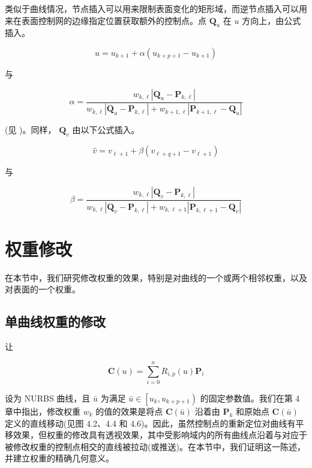 \documentclass[../main.tex]{subfiles}
\begin{document}
类似于曲线情况，节点插入可以用来限制表面变化的矩形域，而逆节点插入可以用来在表面控制网的边缘指定位置获取额外的控制点。点 \({\mathbf{Q}}_{u}\) 在 \(u\) 方向上，由公式插入。

\[
\widehat{u} = {u}_{k + 1} + \alpha \left( {{u}_{k + p + 1} - {u}_{k + 1}}\right)  \tag{11.15}
\]

与

\[
\alpha  = \frac{{w}_{k,\ell }\left| {{\mathbf{Q}}_{u} - {\mathbf{P}}_{k,\ell }}\right| }{{w}_{k,\ell }\left| {{\mathbf{Q}}_{u} - {\mathbf{P}}_{k,\ell }}\right|  + {w}_{k + 1,\ell }\left| {{\mathbf{P}}_{k + 1,\ell } - {\mathbf{Q}}_{u}}\right| }
\]

(见 \cite{Pieg89d})。同样， \({\mathbf{Q}}_{v}\) 由以下公式插入。

\[
\widehat{v} = {v}_{\ell  + 1} + \beta \left( {{v}_{\ell  + q + 1} - {v}_{\ell  + 1}}\right)  \tag{11.16}
\]

与

\[
\beta  = \frac{{w}_{k,\ell }\left| {{\mathbf{Q}}_{v} - {\mathbf{P}}_{k,\ell }}\right| }{{w}_{k,\ell }\left| {{\mathbf{Q}}_{v} - {\mathbf{P}}_{k,\ell }}\right|  + {w}_{k,\ell  + 1}\left| {{\mathbf{P}}_{k,\ell  + 1} - {\mathbf{Q}}_{v}}\right| }
\]



\section{权重修改}

在本节中，我们研究修改权重的效果，特别是对曲线的一个或两个相邻权重，以及对表面的一个权重。





\subsection{单曲线权重的修改}
让

\[
\mathbf{C}\left( u\right)  = \mathop{\sum }\limits_{{i = 0}}^{n}{R}_{i,p}\left( u\right) {\mathbf{P}}_{i} \tag{11.17}
\]

设为 NURBS 曲线，且 \(\bar{u}\) 为满足 \(\bar{u} \in  \left\lbrack  {{u}_{k},{u}_{k + p + 1}}\right)\) 的固定参数值。我们在第 4 章中指出，修改权重 \({w}_{k}\) 的值的效果是将点 \(\mathbf{C}\left( \bar{u}\right)\) 沿着由 \({\mathbf{P}}_{k}\) 和原始点 \(\mathbf{C}\left( \bar{u}\right)\) 定义的直线移动(见图 4.2、4.4 和 4.6)。因此，虽然控制点的重新定位对曲线有平移效果，但权重的修改具有透视效果，其中受影响域内的所有曲线点沿着与对应于被修改权重的控制点相交的直线被拉动(或推送)。在本节中，我们证明这一陈述，并建立权重的精确几何意义。
\end{document}
